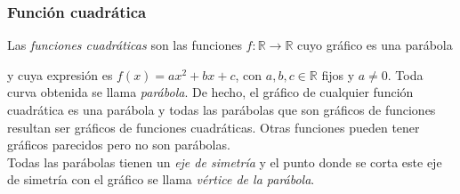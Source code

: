 \documentclass[Análisis.root.tex]{subfiles}
\newcommand{\R}{\mathbb{R}}
\begin{document}
        \subsubsection{Función cuadrática}
        Las \textit{funciones cuadráticas} son las funciones \(f: \R \rightarrow \R\) cuyo gráfico es una parábola
        \begin{center}
        \end{center}
        y cuya expresión es \(f(x)=ax^2+bx+c\), con \(a,b,c\in\R\) fijos y \(a\neq0\).
        Toda curva obtenida se llama \textit{parábola}. De hecho, el gráfico de cualquier función cuadrática es una parábola y todas las parábolas que son gráficos de funciones resultan ser gráficos de funciones cuadráticas. Otras funciones pueden tener gráficos parecidos pero no son parábolas.\\
        Todas las parábolas tienen un \textit{eje de simetría} y el punto donde se corta este eje de simetría con el gráfico se llama \textit{vértice de la parábola}.
\end{document}
